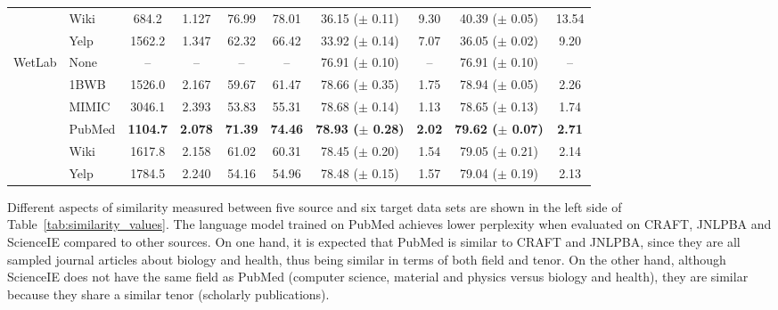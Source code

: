 \documentclass[11pt,a4paper]{article}
\begin{document}
\begin{table*}[ht!]
\begin{small}
\begin{center}
\begin{tabular}{r l | c c c c | c c | c c }
 & Wiki & \phantom{0}684.2 & 1.127 & 76.99 & 78.01 & 36.15 ($\pm$ 0.11) & 9.30 & 40.39 ($\pm$ 0.05) & 13.54 \\
 & Yelp & 1562.2 & 1.347 & 62.32 & 66.42 & 33.92 ($\pm$ 0.14) & 7.07 & 36.05 ($\pm$ 0.02) & 9.20 \\
\midrule
\multirow{6}{*}{WetLab} & None & -- & -- & -- & -- & 76.91 ($\pm$ 0.10) & -- & 76.91 ($\pm$ 0.10) & -- \\ 
 & 1BWB & 1526.0 & 2.167 & 59.67 & 61.47 & 78.66 ($\pm$ 0.35) & 1.75 & 78.94 ($\pm$ 0.05) & 2.26 \\
 & MIMIC & 3046.1 & 2.393 & 53.83 & 55.31 & 78.68 ($\pm$ 0.14) & 1.13 & 78.65 ($\pm$ 0.13) & 1.74 \\
 & PubMed & \bf 1104.7 & \bf 2.078 & \bf 71.39 & \bf 74.46 & \bf 78.93 ($\pm$ 0.28) & \bf 2.02 & \bf 79.62 ($\pm$ 0.07) & \bf 2.71 \\
 & Wiki & 1617.8 & 2.158 & 61.02 & 60.31 & 78.45 ($\pm$ 0.20) & 1.54 & 79.05 ($\pm$ 0.21) & 2.14 \\
 & Yelp & 1784.5 & 2.240 & 54.16 & 54.96 & 78.48 ($\pm$ 0.15) & 1.57 & 79.04 ($\pm$ 0.19) & 2.13 \\
\bottomrule
\end{tabular}
\end{center}
\end{small}
\caption{\label{tab:similarity_values} Similarity between source and target data sets (left), and the effectiveness of word vectors and LMs pretrained using different sources for NER (right). Lower PPL or WVV values indicate higher similarity between source and target, while higher TVC and TVcC values indicate higher similarity. \emph{None} rows refer to the models that word embedding weights are randomly initialized with no pretrained LMs. \emph{$\Delta$} shows absolute improvement. We repeat every NER experiment 5 times, and report mean and standard deviation of test $F_1$ scores.}
\end{table*}




Different aspects of similarity measured between five source and six target data sets are shown in the left side of Table~\ref{tab:similarity_values}. 
The language model trained on PubMed achieves lower perplexity when evaluated on CRAFT, JNLPBA and ScienceIE compared to other sources. On one hand, it is expected that PubMed is similar to CRAFT and JNLPBA, since they are all sampled journal articles about biology and health, thus being similar in terms of both field and tenor. On the other hand, although ScienceIE does not have the same field as PubMed (computer science, material and physics versus biology and health), they are similar because they share a similar tenor (scholarly publications).
\end{document}
